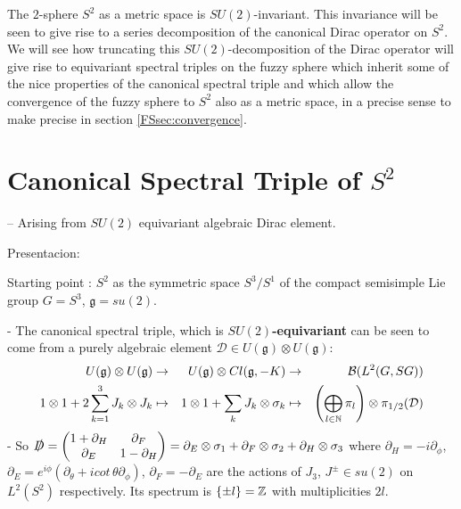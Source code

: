 The $2$-sphere $S^2$ as a metric space is $SU(2)$-invariant. This invariance will be seen to give rise to a series decomposition of the canonical Dirac operator on $S^2$. We will see how truncating this $SU(2)$-decomposition of the Dirac operator will give rise to equivariant spectral triples on the fuzzy sphere which inherit some of the nice properties of the canonical spectral triple and which allow the convergence of the fuzzy sphere to $S^2$ also as a metric space, in a precise sense to make precise in section \ref{FSsec:convergence}.

\section{Canonical Spectral Triple of $S^2$}

-- Arising from $SU(2)$ equivariant algebraic Dirac element.

\linea 

Presentacion:

Starting point \cite{DAndrea2013}: $S^2$ as the symmetric space $S^3/S^1$ of the compact semisimple Lie group $G = S^3$, $\mathfrak g = su(2)$.
    
- The canonical spectral triple, which is \textbf{$SU(2)$-equivariant} can be seen to come from a purely algebraic element $\mathcal D \in U(\mathfrak g) \otimes U(\mathfrak g)$:
    \begin{align*}
        U(\mathfrak g) \otimes U(\mathfrak g) &\to& U(\mathfrak g) \otimes Cl(\mathfrak g, -K) &\to& \mathcal B(L^2(G, SG)) \\
        1 \otimes 1 + 2 \sum_{k = 1}^3 J_k \otimes J_k &\mapsto& 1 \otimes 1 + \sum_k J_k \otimes \sigma_k &\mapsto& \left( \bigoplus_{l\in \mathbb{N}} \pi_l \right) \otimes \pi_{1/2}(\mathcal D)
    \end{align*}
- So $\slashed D = \begin{pmatrix} 1 + \partial_H & \partial_F \\ \partial_E & 1 - \partial_H\end{pmatrix} = \partial_E \otimes \sigma_1 + \partial_F \otimes \sigma_2 + \partial_H \otimes \sigma_3$ where $\partial_H = -i \partial_\phi$, $\partial_E = e^{i\phi} \left( \partial_\theta + i cot\,\theta \partial_\phi \right)$, $\partial_F = -\partial_E%
$ are the actions of $J_3$, $J^\pm \in su(2)$ on $L^2(S^2)$ respectively. Its spectrum is $\{\pm l\} = \mathbb{Z}$ with multiplicities $2l$.%

